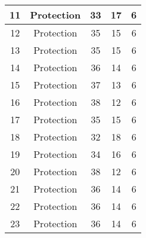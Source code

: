 \documentclass[results.tex]{subfiles}
\begin{document}
\begin{center}
\begin{tabular}{| c || c | c | c | c |}
            \hline
            11                      & Protection                   & 33                     & 17                      & 6                    \\
            \hline
            12                      & Protection                   & 35                     & 15                      & 6                    \\
            \hline
            13                      & Protection                   & 35                     & 15                      & 6                    \\
            \hline
            14                      & Protection                   & 36                     & 14                      & 6                    \\
            \hline
            15                      & Protection                   & 37                     & 13                      & 6                    \\
            \hline
            16                      & Protection                   & 38                     & 12                      & 6                    \\
            \hline
            17                      & Protection                   & 35                     & 15                      & 6                    \\
            \hline
            18                      & Protection                   & 32                     & 18                      & 6                    \\
            \hline
            19                      & Protection                   & 34                     & 16                      & 6                    \\
            \hline
            20                      & Protection                   & 38                     & 12                      & 6                    \\
            \hline
            21                      & Protection                   & 36                     & 14                      & 6                    \\
            \hline
            22                      & Protection                   & 36                     & 14                      & 6                    \\
            \hline
            23                      & Protection                   & 36                     & 14                      & 6                    \\

\end{tabular}
\end{center}
\end{document}
